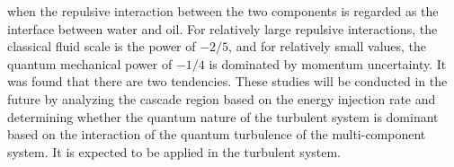 \documentclass[12pt,a4paper]{jbook}
\begin{document}
    when the repulsive interaction between the two components is regarded as the interface between water and oil.
    For relatively large repulsive interactions,
    the classical fluid scale is the power of $−2/5$,
    and for relatively small values,
    the quantum mechanical power of $-1/4$ is dominated by momentum uncertainty.
    It was found that there are two tendencies.
    These studies will be conducted in the future by analyzing the cascade region
    based on the energy injection rate
    and determining whether the quantum nature of the turbulent system
    is dominant based on the interaction of the quantum turbulence of the multi-component system.
    It is expected to be applied in the turbulent system.
    \\
\end{document}
